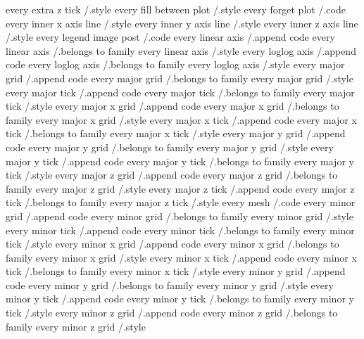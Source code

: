 every extra z tick             /.style
every fill between plot        /.style
every forget plot              /.code
every inner x axis line        /.style
every inner y axis line        /.style
every inner z axis line        /.style
every legend image post        /.code
every linear axis              /.append code
every linear axis              /.belongs to family
every linear axis              /.style
every loglog axis              /.append code
every loglog axis              /.belongs to family
every loglog axis              /.style
every major grid               /.append code
every major grid               /.belongs to family
every major grid               /.style
every major tick               /.append code
every major tick               /.belongs to family
every major tick               /.style
every major x grid             /.append code
every major x grid             /.belongs to family
every major x grid             /.style
every major x tick             /.append code
every major x tick             /.belongs to family
every major x tick             /.style
every major y grid             /.append code
every major y grid             /.belongs to family
every major y grid             /.style
every major y tick             /.append code
every major y tick             /.belongs to family
every major y tick             /.style
every major z grid             /.append code
every major z grid             /.belongs to family
every major z grid             /.style
every major z tick             /.append code
every major z tick             /.belongs to family
every major z tick             /.style
every mesh                     /.code
every minor grid               /.append code
every minor grid               /.belongs to family
every minor grid               /.style
every minor tick               /.append code
every minor tick               /.belongs to family
every minor tick               /.style
every minor x grid             /.append code
every minor x grid             /.belongs to family
every minor x grid             /.style
every minor x tick             /.append code
every minor x tick             /.belongs to family
every minor x tick             /.style
every minor y grid             /.append code
every minor y grid             /.belongs to family
every minor y grid             /.style
every minor y tick             /.append code
every minor y tick             /.belongs to family
every minor y tick             /.style
every minor z grid             /.append code
every minor z grid             /.belongs to family
every minor z grid             /.style
